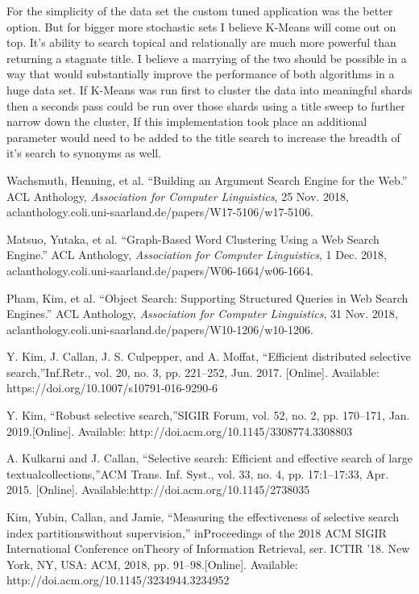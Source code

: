 \documentclass{article}
\begin{document}
For the simplicity of the data set the custom tuned application was the better option. But for bigger more stochastic sets I believe K-Means will come out on top. It's ability to search topical and relationally are much more powerful than returning a stagnate title. I believe a marrying of the two should be possible in a way that would substantially improve the performance of both algorithms in a huge data set. If K-Means was run first to cluster the data into meaningful shards then a seconds pass could be run over those shards using a title sweep to further narrow down the cluster, If this implementation took place an additional parameter would need to be added to the title search to increase the breadth of it's search to synonyms as well. 

\newpage

\begin{thebibliography}{999}
Wachsmuth, Henning, et al. “Building an Argument Search Engine for the Web.” ACL Anthology, \emph{Association for Computer Linguistics}, 25 Nov. 2018, aclanthology.coli.uni-saarland.de/papers/W17-5106/w17-5106.

Matsuo, Yutaka, et al. “Graph-Based Word Clustering Using a Web Search Engine.” ACL Anthology, \emph{Association for Computer Linguistics}, 1 Dec. 2018, aclanthology.coli.uni-saarland.de/papers/W06-1664/w06-1664.

Pham, Kim, et al. “Object Search: Supporting Structured Queries in Web Search Engines.” ACL Anthology, \emph{Association for Computer Linguistics}, 31 Nov. 2018, aclanthology.coli.uni-saarland.de/papers/W10-1206/w10-1206.

Y. Kim, J. Callan, J. S. Culpepper, and A. Moffat, “Efficient distributed selective search,”Inf.Retr., vol. 20, no. 3, pp. 221–252, Jun. 2017. [Online]. Available: https://doi.org/10.1007/s10791-016-9290-6

Y. Kim, “Robust selective search,”SIGIR Forum, vol. 52, no. 2, pp. 170–171, Jan. 2019.[Online]. Available: http://doi.acm.org/10.1145/3308774.3308803

A. Kulkarni and J. Callan, “Selective search:  Efficient and effective search of large textualcollections,”ACM Trans. Inf. Syst., vol. 33, no. 4, pp. 17:1–17:33, Apr. 2015. [Online]. Available:http://doi.acm.org/10.1145/2738035

Kim, Yubin, Callan, and Jamie, “Measuring the effectiveness of selective search index partitionswithout supervision,” inProceedings of the 2018 ACM SIGIR International Conference onTheory of Information Retrieval, ser. ICTIR ’18.  New York, NY, USA: ACM, 2018, pp. 91–98.[Online]. Available: http://doi.acm.org/10.1145/3234944.3234952

\end{thebibliography}
\end{document}
